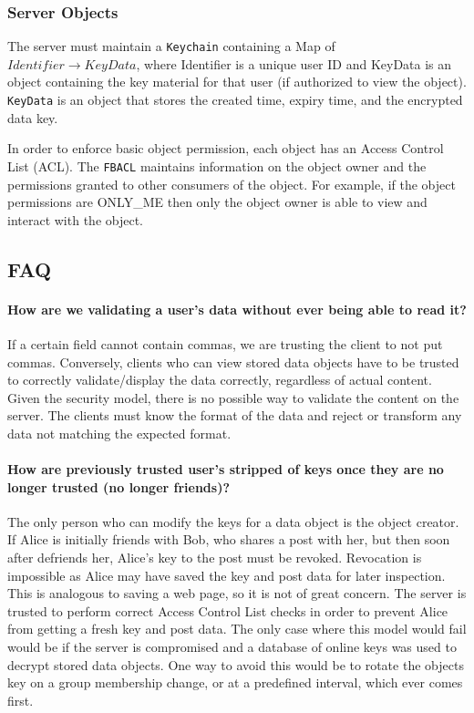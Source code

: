 \documentclass{article}
\begin{document}
\subsubsection*{Server Objects}
The server must maintain a \texttt{Keychain} containing a Map of $Identifier \rightarrow KeyData$, where Identifier is a unique user ID and KeyData is an object containing the key material for that user (if authorized to view the object). \texttt{KeyData} is an object that stores the created time, expiry time, and the encrypted data key.

In order to enforce basic object permission, each object has an Access Control List (ACL). The \texttt{FBACL} maintains information on the object owner and the permissions granted to other consumers of the object. For example, if the object permissions are ONLY\_ME then only the object owner is able to view and interact with the object.

\subsection*{FAQ}
\paragraph*{How are we validating a user's data without ever being able to read it?} If a certain field cannot contain commas, we are trusting the client to not put commas. Conversely, clients who can view stored data objects have to be trusted to correctly validate/display the data correctly, regardless of actual content. Given the security model, there is no possible way to validate the content on the server. The clients must know the format of the data and reject or transform any data not matching the expected format.
  \paragraph*{How are previously trusted user's stripped of keys once they are no longer trusted (no longer friends)?} The only person who can modify the keys for a data object is the object creator. If Alice is initially friends with Bob, who shares a post with her, but then soon after defriends her, Alice's key to the post must be revoked. Revocation is impossible as Alice may have saved the key and post data for later inspection. This is analogous to saving a web page, so it is not of great concern. The server is trusted to perform correct Access Control List checks in order to prevent Alice from getting a fresh key and post data. The only case where this model would fail would be if the server is compromised and a database of online keys was used to decrypt stored data objects. One way to avoid this would be to rotate the objects key on a group membership change, or at a predefined interval, which ever comes first.
\end{document}
